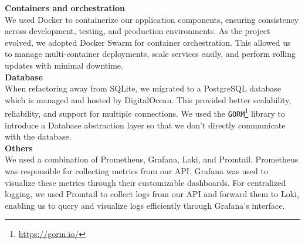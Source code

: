 \noindent \textbf{Containers and orchestration}
\\
We used Docker to containerize our application components, ensuring consistency across development, testing, and production environments. As the project evolved, we adopted Docker Swarm for container orchestration. This allowed us to manage multi-container deployments, scale services easily, and perform rolling updates with minimal downtime.
\\

\noindent \textbf{Database}
\\
When refactoring away from SQLite, we migrated to a PostgreSQL database which is managed and hosted by DigitalOcean. This provided better scalability, reliability, and support for multiple connections. We used the \texttt{GORM}\footnote{\url{https://gorm.io/}} library to introduce a Database abstraction layer so that we don't directly communicate with the database.
\\

\noindent \textbf{Others}
\\
We used a combination of Prometheus, Grafana, Loki, and Promtail. Prometheus was responsible for collecting metrics from our API. Grafana was used to visualize these metrics through their customizable dashboards. For centralized logging, we used Promtail to collect logs from our API and forward them to Loki, enabling us to query and visualize logs efficiently through Grafana’s interface.


